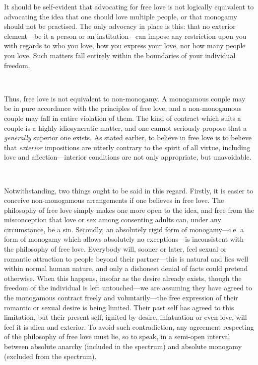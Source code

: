 \documentclass[a4paper, 12pt]{article}
\begin{document}
It should be self-evident that advocating for free love is not logically
equivalent to advocating the idea that one should love multiple people, or that
monogamy should not be practised. The only advocacy in place is this: that no
exterior element---be it a person or an institution---can impose any
restriction upon you with regards to who you love, how you express your love,
nor how many people you love. Such matters fall entirely within the boundaries
of your individual freedom.

~

Thus, free love is not equivalent to non-monogamy. A monogamous couple may be
in pure accordance with the principles of free love, and a non-monogamous
couple may fall in entire violation of them. The kind of contract which suits a
couple is a highly idiosyncratic matter, and one cannot seriously propose that
a \textit{generally} superior one exists. As stated earlier, to believe in free
love is to believe that \textit{exterior} impositions are utterly contrary to
the spirit of all virtue, including love and affection---interior conditions
are not only appropriate, but unavoidable.

~ 

Notwithstanding, two things ought to be said in this regard. Firstly, it is
easier to conceive non-monogamous arrangements if one believes in free love.
The philosophy of free love simply makes one more open to the idea, and free
from the misconception that love or sex among consenting adults can, under any
circumstance, be a sin. Secondly, an absolutely rigid form of monogamy---i.e. a
form of monogamy which allows absolutely no exceptions---is inconsistent with
the philosophy of free love. Everybody will, sooner or later, feel sexual or
romantic attraction to people beyond their partner---this is natural and lies
well within normal human nature, and only a dishonest denial of
facts could pretend otherwise. When this happens, insofar as the desire already
exists, though the freedom of the individual is left untouched---we are
assuming they have agreed to the monogamous contract freely and
voluntarily---the free expression of their romantic or sexual desire is being
limited. Their past self has agreed to this limitation, but their present self,
ignited by desire, infatuation or even love, will feel it is alien and
exterior. To avoid such contradiction, any agreement respecting of the philosophy 
of free love must lie, so to speak, in a semi-open interval between absolute anarchy
(included in the spectrum) and absolute monogamy (excluded from the spectrum).
\end{document}
